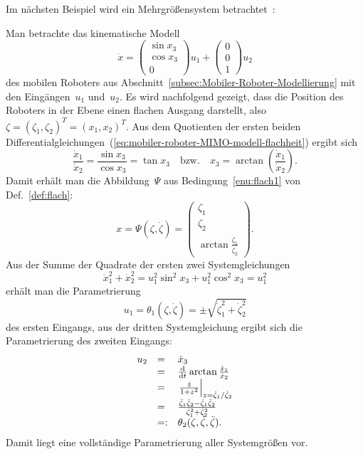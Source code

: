 Im nächsten Beispiel wird ein Mehrgrößensystem betrachtet~\cite{rothfuss97flach,ryu2011}:
\begin{example}
\label{exa:Mobiler-Roboter-Flachheit}Man betrachte das kinematische
Modell
\begin{equation}
\dot{x}=\left(\begin{array}{c}
\sin x_{3}\\
\cos x_{3}\\
0
\end{array}\right)u_{1}+\left(\begin{array}{c}
0\\
0\\
1
\end{array}\right)u_{2}\label{eq:mobiler-roboter-MIMO-modell-flachheit}
\end{equation}
des mobilen Roboters aus Abschnitt~\ref{subsec:Mobiler-Roboter-Modellierung}
mit den Eingängen~$u_{1}$ und~$u_{2}$. Es wird nachfolgend gezeigt,
dass die Position des Roboters in der Ebene einen flachen Ausgang
darstellt, also $\zeta=(\zeta_{1},\zeta_{2})^{T}=(x_{1},x_{2})^{T}$.
Aus dem Quotienten der ersten beiden Differentialgleichungen~(\ref{eq:mobiler-roboter-MIMO-modell-flachheit})
ergibt sich 
\[
\frac{\dot{x}_{1}}{\dot{x}_{2}}=\frac{\sin x_{3}}{\cos x_{3}}=\tan x_{3}\quad\text{bzw.}\quad x_{3}=\arctan\left(\frac{\dot{x}_{1}}{\dot{x}_{2}}\right).
\]
Damit erhält man die Abbildung~$\Psi$ aus Bedingung~\ref{enu:flach1}
von Def.~\ref{def:flach}:
\[
x=\Psi(\zeta,\dot{\zeta})=\left(\begin{array}{c}
\zeta_{1}\\
\zeta_{2}\\
\arctan\frac{\dot{\zeta}_{1}}{\dot{\zeta}_{2}}
\end{array}\right).
\]
Aus der Summe der Quadrate der ersten zwei Systemgleichungen 
\[
\dot{x}_{1}^{2}+\dot{x}_{2}^{2}=u_{1}^{2}\sin^{2}x_{3}+u_{1}^{2}\cos^{2}x_{3}=u_{1}^{2}
\]
erhält man die Parametrierung
\[
u_{1}=\theta_{1}(\zeta,\dot{\zeta})=\pm\sqrt{\dot{\zeta}_{1}^{2}+\dot{\zeta}_{2}^{2}}
\]
des ersten Eingangs, aus der dritten Systemgleichung ergibt sich die
Parametrierung des zweiten Eingangs: 
\[
\begin{array}{lll}
u_{2} & = & \dot{x}_{3}\\
 & = & \frac{{\mathrm{d}}}{{\mathrm{d}} t}\arctan\frac{\dot{x}_{1}}{\dot{x}_{2}}\\
 & = & \left.\frac{\dot{z}}{1+z^{2}}\right|_{z=\dot{\zeta}_{1}/\dot{\zeta}_{2}}\\
 & = & \frac{\ddot{\zeta}_{1}\dot{\zeta}_{2}-\dot{\zeta}_{1}\ddot{\zeta}_{2}}{\dot{\zeta}_{1}^{2}+\dot{\zeta}_{2}^{2}}\\
 & =: & \theta_{2}(\zeta,\dot{\zeta},\ddot{\zeta}).
\end{array}
\]
Damit liegt eine vollständige Parametrierung aller Systemgrößen vor.
\end{example}

